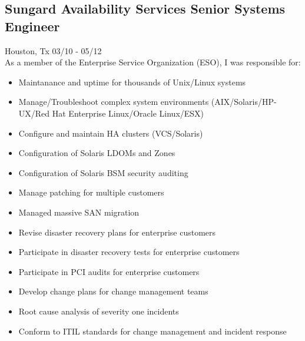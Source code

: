 \documentclass{article}
\begin{document}
  \subsection{Sungard Availability Services \hfill Senior Systems Engineer}
  Houston, Tx \hfill 03/10 - 05/12\\
  As a member of the Enterprise Service Organization (ESO), I was responsible for:\\
  \begin{itemize}
  \item Maintanance and uptime for thousands of Unix/Linux systems
  \item Manage/Troubleshoot complex system environments (AIX/Solaris/HP-UX/Red Hat Enterprise Linux/Oracle Linux/ESX)
  \item Configure and maintain HA clusters (VCS/Solaris)
  \item Configuration of Solaris LDOMs and Zones
  \item Configuration of Solaris BSM security auditing
  \item Manage patching for multiple customers
  \item Managed massive SAN migration
  \item Revise disaster recovery plans for enterprise customers
  \item Participate in disaster recovery tests for enterprise customers
  \item Participate in PCI audits for enterprise customers
  \item Develop change plans for change management teams
  \item Root cause analysis of severity one incidents
  \item Conform to ITIL standards for change management and incident response
  \end{itemize}
\end{document}
